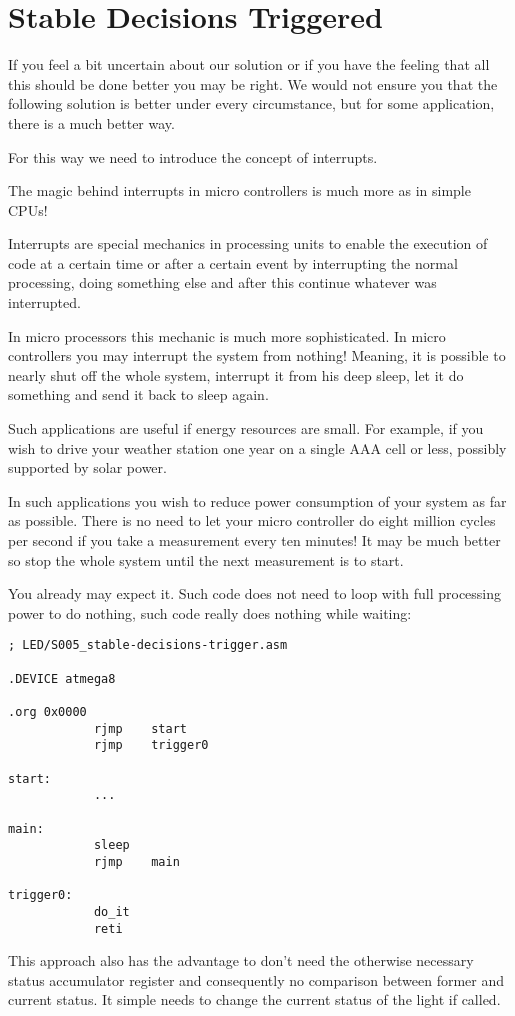 \section{Stable Decisions Triggered}

If you feel a bit uncertain about our solution or if you have the feeling that all this should be done better you may be right. We would not ensure you that the following solution is better under every circumstance, but for some application, there is a much better way.

For this way we need to introduce the concept of interrupts.

The magic behind interrupts in micro controllers is much more as in simple CPUs!

Interrupts are special mechanics in processing units to enable the execution of code at a certain time or after a certain event by interrupting the normal processing, doing something else and after this continue whatever was interrupted.

In micro processors this mechanic is much more sophisticated. In micro controllers you may interrupt the system from nothing! Meaning, it is possible to nearly shut off the whole system, interrupt it from his deep sleep, let it do something and send it back to sleep again.

Such applications are useful if energy resources are small. For example, if you wish to drive your weather station one year on a single AAA cell or less, possibly supported by solar power.

In such applications you wish to reduce power consumption of your system as far as possible. There is no need to let your micro controller do eight million cycles per second if you take a measurement every ten minutes! It may be much better so stop the whole system until the next measurement is to start.

You already may expect it. Such code does not need to loop with full processing power to do nothing, such code really does nothing while waiting:

\begin{lstlisting}
; LED/S005_stable-decisions-trigger.asm

.DEVICE atmega8

.org 0x0000
            rjmp    start
            rjmp    trigger0
            
start:
            ...
            
main:
            sleep
            rjmp    main

trigger0:
            do_it
            reti
\end{lstlisting}

This approach also has the advantage to don't need the otherwise necessary status accumulator register and consequently no comparison between former and current status. It simple needs to change the current status of the light if called.
